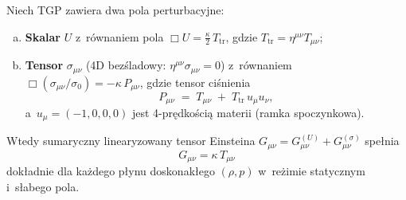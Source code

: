 \begin{theorem}%
\label{thm:two-field-emergence}
Niech TGP zawiera dwa pola perturbacyjne:
\begin{enumerate}[(a)]
  \item \textbf{Skalar} $U$ z~r\'ownaniem pola
    $\Box U = \tfrac{\kappa}{2}\,T_{\mathrm{tr}}$,
    gdzie $T_{\mathrm{tr}} = \eta^{\mu\nu}T_{\mu\nu}$;
  \item \textbf{Tensor} $\sigma_{\mu\nu}$ (4D bezśladowy:
    $\eta^{\mu\nu}\sigma_{\mu\nu}=0$) z~r\'ownaniem
    $\Box(\sigma_{\mu\nu}/\sigma_0) = -\kappa\,P_{\mu\nu}$,
    gdzie tensor ci\'snienia
    \begin{equation}\label{eq:P-tensor-def}
      P_{\mu\nu} \;=\; T_{\mu\nu} \;+\; T_{\mathrm{tr}}\,u_\mu u_\nu,
    \end{equation}
    a~$u_\mu = (-1,0,0,0)$ jest 4-pr\k{e}dko\'sci\k{a} materii
    (ramka spoczynkowa).
\end{enumerate}
Wtedy sumaryczny linearyzowany tensor Einsteina
$G_{\mu\nu} = G^{(U)}_{\mu\nu} + G^{(\sigma)}_{\mu\nu}$ spe\l{}nia
\begin{equation}\label{eq:two-field-full}
  \boxed{G_{\mu\nu} = \kappa\,T_{\mu\nu}}
\end{equation}
dok\l{}adnie dla ka\.zdego p\l{}ynu doskonak\l{}ego
$(\rho, p)$ w~re\.zimie statycznym i~s\l{}abego pola.
\end{theorem}

